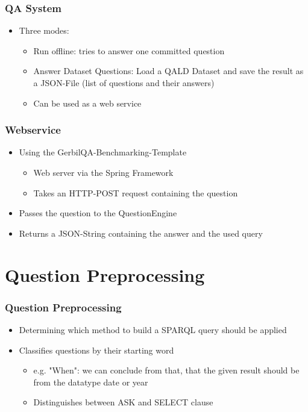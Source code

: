 \documentclass{beamer}
\begin{document}
\begin{frame}
\frametitle{QA System}
\begin{itemize}
	\item Three modes:
	\begin{itemize}		
		\item Run offline: tries to answer one committed question
		\item Answer Dataset Questions: Load a QALD Dataset and save the result as a JSON-File (list of questions and their answers)
		\item Can be used as a web service
	\end{itemize}
\end{itemize}
\end{frame}

\begin{frame}
	\frametitle{Webservice}
	\begin{itemize}
		\item Using the GerbilQA-Benchmarking-Template
		\begin{itemize}
			\item Web server via the Spring Framework
			\item Takes an HTTP-POST request containing the question
		\end{itemize}
		\item Passes the question to the QuestionEngine
		\item Returns a JSON-String containing the answer and the used query
	\end{itemize}
\end{frame}

\section{Question Preprocessing}

\begin{frame}
\frametitle{Question Preprocessing}
\begin{itemize}
	\item Determining which method to build a SPARQL query should be applied
	\item Classifies questions by their starting word
	\begin{itemize}
		\item e.g. "When": we can conclude from that, that the given result should be from the datatype date or year
		\item Distinguishes between ASK and SELECT clause
	\end{itemize}
\end{itemize}
\end{frame}
\end{document}
